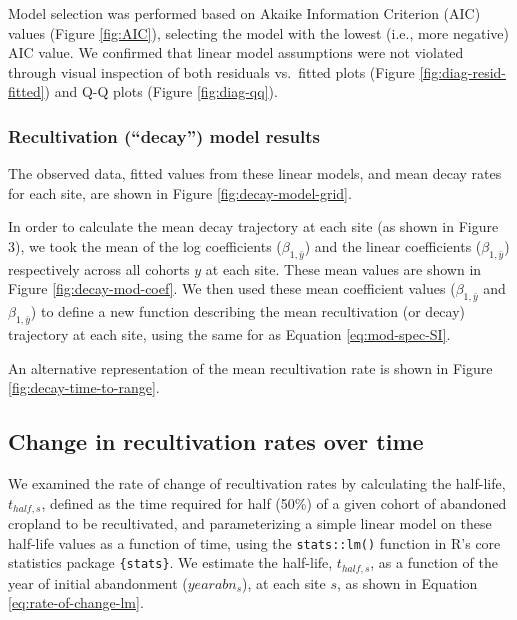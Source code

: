 \documentclass[
]{article}
\begin{document}
Model selection was performed based on Akaike Information Criterion (AIC) values (Figure \ref{fig:AIC}), selecting the model with the lowest (i.e., more negative) AIC value.
We confirmed that linear model assumptions were not violated through visual inspection of both residuals vs.~fitted plots (Figure \ref{fig:diag-resid-fitted}) and Q-Q plots (Figure \ref{fig:diag-qq}).

\hypertarget{recultivation-decay-model-results}{%
\subsubsection{Recultivation (``decay'') model results}\label{recultivation-decay-model-results}}

The observed data, fitted values from these linear models, and mean decay rates for each site, are shown in Figure \ref{fig:decay-model-grid}.

In order to calculate the mean decay trajectory at each site (as shown in Figure 3), we took the mean of the log coefficients (\(\beta_{1, \bar{y}}\)) and the linear coefficients (\(\beta_{1, \bar{y}}\)) respectively across all cohorts \(y\) at each site.
These mean values are shown in Figure \ref{fig:decay-mod-coef}.
We then used these mean coefficient values (\(\beta_{1, \bar{y}}\) and \(\beta_{1, \bar{y}}\)) to define a new function describing the mean recultivation (or decay) trajectory at each site, using the same for as Equation \eqref{eq:mod-spec-SI}.

An alternative representation of the mean recultivation rate is shown in Figure \ref{fig:decay-time-to-range}.

\hypertarget{section-methods-rate-of-change}{%
\subsection{Change in recultivation rates over time}\label{section-methods-rate-of-change}}

We examined the rate of change of recultivation rates by calculating the half-life, \(t_{half,s}\), defined as the time required for half (50\%) of a given cohort of abandoned cropland to be recultivated, and parameterizing a simple linear model on these half-life values as a function of time, using the \texttt{stats::lm()} function in R's core statistics package \texttt{\{stats\}}.
We estimate the half-life, \(t_{half,s}\), as a function of the year of initial abandonment (\(yearabn_{s}\)), at each site \(s\), as shown in Equation \eqref{eq:rate-of-change-lm}.
\end{document}
